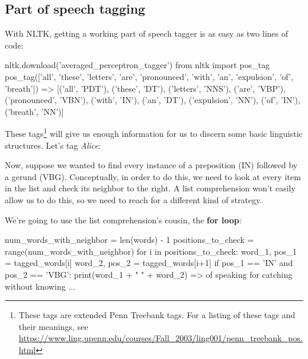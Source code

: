 \documentclass{article}
\begin{document}
\subsection{Part of speech tagging}

With NLTK, getting a working part of speech tagger is as easy as two lines of code:

\begin{python}
nltk.download('averaged_perceptron_tagger')
from nltk import pos_tag
pos_tag(['all', 'these', 'letters', 'are', 
'pronounced', 'with', 'an', 'expulsion', 
'of', 'breath'])
=> [('all', 'PDT'), ('these', 'DT'), 
('letters', 'NNS'), ('are', 'VBP'), 
('pronounced', 'VBN'), ('with', 'IN'), 
('an', 'DT'), ('expulsion', 'NN'), 
('of', 'IN'), ('breath', 'NN')]
\end{python}

\noindent These tags\footnote{These tags are extended Penn Treebank tags. For a listing of these tags and their meanings, see \url{https://www.ling.upenn.edu/courses/Fall_2003/ling001/penn_treebank_pos.html}} will give us enough information for us to discern some basic linguistic structures. Let's tag \emph{Alice}:


Now, suppose we wanted to find every instance of a preposition (IN) followed by a gerund (VBG). Conceptually, in order to do this, we need to look at every item in the list and check its neighbor to the right. A list comprehension won't easily allow us to do this, so we need to reach for a different kind of strategy.

We're going to use the list comprehension's cousin, the \textbf{for loop}:

\clearpage\begin{python}
num_words_with_neighbor = len(words) - 1
positions_to_check = range(num_words_with_neighbor)
for i in positions_to_check:
    word_1, pos_1 = tagged_words[i]
    word_2, pos_2 = tagged_words[i+1]
    if pos_1 == 'IN' and pos_2 == 'VBG':
        print(word_1 + " " + word_2)
=> of speaking
for catching
without knowing
...
\end{python}
\end{document}
